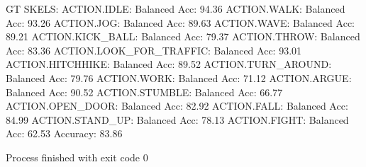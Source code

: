 GT SKELS:
ACTION.IDLE: Balanced Acc: 94.36%
ACTION.WALK: Balanced Acc: 93.26%
ACTION.JOG: Balanced Acc: 89.63%
ACTION.WAVE: Balanced Acc: 89.21%
ACTION.KICK_BALL: Balanced Acc: 79.37%
ACTION.THROW: Balanced Acc: 83.36%
ACTION.LOOK_FOR_TRAFFIC: Balanced Acc: 93.01%
ACTION.HITCHHIKE: Balanced Acc: 89.52%
ACTION.TURN_AROUND: Balanced Acc: 79.76%
ACTION.WORK: Balanced Acc: 71.12%
ACTION.ARGUE: Balanced Acc: 90.52%
ACTION.STUMBLE: Balanced Acc: 66.77%
ACTION.OPEN_DOOR: Balanced Acc: 82.92%
ACTION.FALL: Balanced Acc: 84.99%
ACTION.STAND_UP: Balanced Acc: 78.13%
ACTION.FIGHT: Balanced Acc: 62.53%
Accuracy: 83.86%

Process finished with exit code 0

